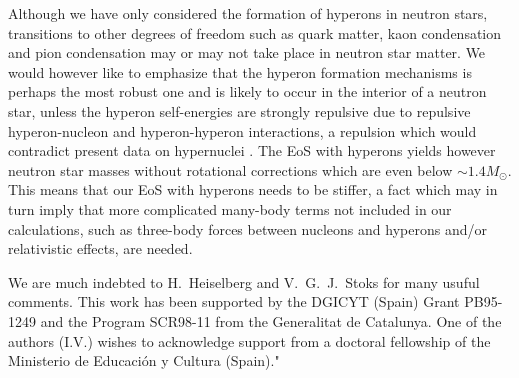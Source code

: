 Although we have only considered the formation of hyperons in neutron
stars, transitions to other degrees of freedom such as quark matter,
kaon condensation and pion condensation may or may not take place 
in neutron star matter.
We would however like to emphasize that the hyperon formation mechanisms
is perhaps the most robust one and is likely to occur in the interior 
of a neutron star, unless the hyperon self-energies are strongly repulsive due
to repulsive hyperon-nucleon and hyperon-hyperon interactions, a repulsion 
which  would contradict
present data on hypernuclei \cite{bando}. 
The EoS with hyperons yields however neutron star masses without 
rotational corrections which are even below $\sim 1.4M_\odot$.
This means that our EoS with hyperons needs to be stiffer,  
a fact which may in turn
imply that more complicated many-body terms not included in our calculations,
such as three-body forces between nucleons and hyperons and/or relativistic
effects,  are needed.

We are much indebted to H.~Heiselberg and V.~G.~J.~Stoks for many usuful comments.
This work has been supported by the DGICYT (Spain) Grant PB95-1249 and
the Program SCR98-11 from the Generalitat de Catalunya. One of the authors
(I.V.) wishes to acknowledge support from a doctoral fellowship of the
Ministerio de Educaci\'on y Cultura (Spain)."  

